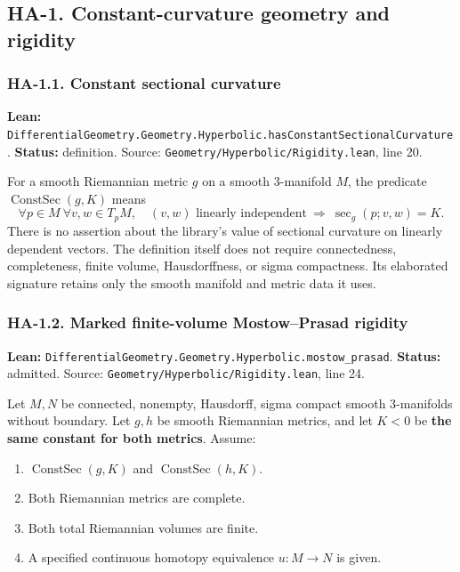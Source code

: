 \documentclass[
  letterpaper,
  11pt]{article}
\providecommand{\tightlist}{%
  \setlength{\itemsep}{0pt}\setlength{\parskip}{0pt}}
\begin{document}
\subsection{HA-1. Constant-curvature geometry and rigidity}\label{ha-1}

\subsubsection{HA-1.1. Constant sectional curvature}\label{ha-1-1}

\textbf{Lean:}
{\small\texttt{Differential\allowbreak{}Geometry.\allowbreak{}Geometry.\allowbreak{}Hyperbolic.\allowbreak{}has\allowbreak{}Constant\allowbreak{}Sectional\allowbreak{}Curvature}}.
\textbf{Status:} definition. Source:
{\small\texttt{Geometry/\allowbreak{}Hyperbolic/\allowbreak{}Rigidity.\allowbreak{}lean}},
line 20.

For a smooth Riemannian metric \(g\) on a smooth 3-manifold \(M\), the
predicate \(\operatorname{ConstSec}(g,K)\) means \[
 \forall p\in M\ \forall v,w\in T_pM,
 \quad (v,w)\text{ linearly independent}
 \ \Longrightarrow\ \sec_g(p;v,w)=K.
\] There is no assertion about the library's value of sectional
curvature on linearly dependent vectors. The definition itself does not
require connectedness, completeness, finite volume, Hausdorffness, or
sigma compactness. Its elaborated signature retains only the smooth
manifold and metric data it uses.

\subsubsection{HA-1.2. Marked finite-volume Mostow--Prasad
rigidity}\label{ha-1-2}

\textbf{Lean:}
{\small\texttt{Differential\allowbreak{}Geometry.\allowbreak{}Geometry.\allowbreak{}Hyperbolic.\allowbreak{}mostow\_\allowbreak{}prasad}}.
\textbf{Status:} admitted. Source:
{\small\texttt{Geometry/\allowbreak{}Hyperbolic/\allowbreak{}Rigidity.\allowbreak{}lean}},
line 24.

Let \(M,N\) be connected, nonempty, Hausdorff, sigma compact smooth
3-manifolds without boundary. Let \(g,h\) be smooth Riemannian metrics,
and let \(K<0\) be \textbf{the same constant for both metrics}. Assume:

\begin{enumerate}
\def\labelenumi{\arabic{enumi}.}
\tightlist
\item
  \(\operatorname{ConstSec}(g,K)\) and \(\operatorname{ConstSec}(h,K)\).
\item
  Both Riemannian metrics are complete.
\item
  Both total Riemannian volumes are finite.
\item
  A specified continuous homotopy equivalence \(u:M\to N\) is given.
\end{enumerate}
\end{document}
